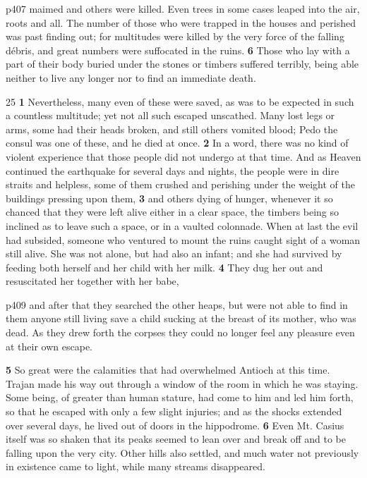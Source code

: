p407 maimed and others were killed. Even trees in some cases leaped into the air, roots and all. The number of those who were trapped in the houses and perished was past finding out; for multitudes were killed by the very force of the falling débris, and great numbers were suffocated in the ruins. \textbf{6} Those who lay with a part of their body buried under the stones or timbers suffered terribly, being able neither to live any longer nor to find an immediate death.

25
\textbf{1} Nevertheless, many even of these were saved, as was to be expected in such a countless multitude; yet not all such escaped unscathed. Many lost legs or arms, some had their heads broken, and still others vomited blood; Pedo the consul was one of these, and he died at once. \textbf{2} In a word, there was no kind of violent experience that those people did not undergo at that time. And as Heaven continued the earthquake for several days and nights, the people were in dire straits and helpless, some of them crushed and perishing under the weight of the buildings pressing upon them, \textbf{3} and others dying of hunger, whenever it so chanced that they were left alive either in a clear space, the timbers being so inclined as to leave such a space, or in a vaulted colonnade. When at last the evil had subsided, someone who ventured to mount the ruins caught sight of a woman still alive. She was not alone, but had also an infant; and she had survived by feeding both herself and her child with her milk. \textbf{4} They dug her out and resuscitated her together with her babe,

p409 and after that they searched the other heaps, but were not able to find in them anyone still living save a child sucking at the breast of its mother, who was dead. As they drew forth the corpses they could no longer feel any pleasure even at their own escape.

\textbf{5} So great were the calamities that had overwhelmed Antioch at this time. Trajan made his way out through a window of the room in which he was staying. Some being, of greater than human stature, had come to him and led him forth, so that he escaped with only a few slight injuries; and as the shocks extended over several days, he lived out of doors in the hippodrome. \textbf{6} Even Mt. Casius itself was so shaken that its peaks seemed to lean over and break off and to be falling upon the very city. Other hills also settled, and much water not previously in existence came to light, while many streams disappeared.


